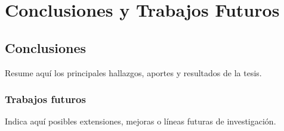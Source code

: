 \chapter{Conclusiones y Trabajos Futuros}

\section{Conclusiones}

Resume aquí los principales hallazgos, aportes y resultados de la tesis.

\subsection{Trabajos futuros}

Indica aquí posibles extensiones, mejoras o líneas futuras de investigación.
